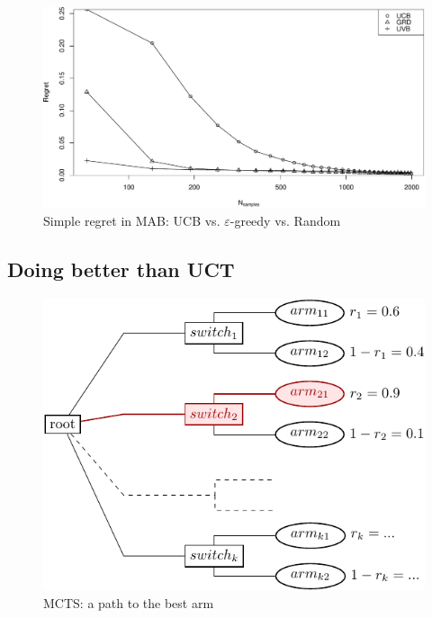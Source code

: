 \documentclass{article}
\begin{document}
\begin{figure}[t]
  \centering
  \includegraphics[scale=0.64]{onelevel-64.pdf}
  \caption{Simple regret in MAB: UCB vs. $\varepsilon$-greedy vs. Random}
  \label{fig:onelevel-64}
\end{figure}


\subsection{Doing better than UCT}

\begin{figure}[t]
  \centering
  \includegraphics[scale=1.2]{twolevel-tree.pdf}
  \caption{MCTS: a path to the best arm}
  \label{fig:twolevel-tree}
\end{figure}
\end{document}
